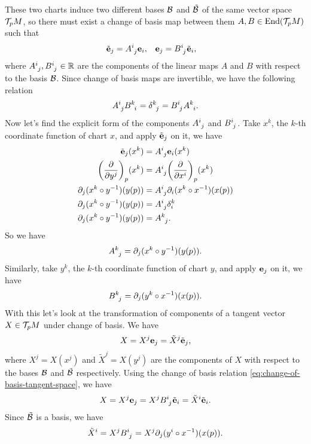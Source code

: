 These two charts induce two different bases \(\mathcal B\) and \(\tilde{\mathcal B}\) of the same vector space \(\mathcal T_p M\), so there must exist a change of basis map between them \(A, B \in \operatorname{End}(\mathcal T_p M)\) such that
\begin{align} \label{eq:change-of-basis-tangent-space}
    \tilde{\vb{e}}_j & = \tensor{A}{^i_j} \vb{e}_i, & \vb{e}_j & = \tensor{B}{^i_j} \tilde{\vb{e}}_i,
\end{align}
where \(\tensor{A}{^i_j}, \tensor{B}{^i_j} \in \R\) are the components of the linear maps \(A\) and \(B\) with respect to the basis \(\mathcal B\). Since change of basis maps are invertible, we have the following relation
\begin{equation}
    \tensor{A}{^i_j} \tensor{B}{^k_i} = \tensor{\delta}{^k_j} = \tensor{B}{^i_j} \tensor{A}{^k_i}.
\end{equation}
Now let's find the explicit form of the components \(\tensor{A}{^i_j}\) and \(\tensor{B}{^i_j}\). Take \(x^k\), the \(k\)-th coordinate function of chart \(x\), and apply \(\tilde{\vb{e}}_j\) on it, we have
\begin{align*}
    \tilde{\vb{e}}_j(x^k)               & = \tensor{A}{^i_j} \vb{e}_i(x^k)                       \\
    \qty(\pdv{y^j})_p (x^k)             & = \tensor{A}{^i_j} \qty(\pdv{x^i})_p (x^k)             \\
    \partial_j (x^k \circ y^{-1})(y(p)) & = \tensor{A}{^i_j} \partial_i (x^k \circ x^{-1})(x(p)) \\
    \partial_j (x^k \circ y^{-1})(y(p)) & = \tensor{A}{^i_j} \delta_i^k                          \\
    \partial_j (x^k \circ y^{-1})(y(p)) & = \tensor{A}{^k_j}.
\end{align*}
So we have
\begin{equation}
    \tensor{A}{^k_j} = \partial_j (x^k \circ y^{-1})(y(p)).
\end{equation}
Similarly, take \(y^k\), the \(k\)-th coordinate function of chart \(y\), and apply \(\vb{e}_j\) on it, we have
\begin{equation}
    \tensor{B}{^k_j} = \partial_j (y^k \circ x^{-1})(x(p)).
\end{equation}
With this let's look at the transformation of components of a tangent vector \(X \in \mathcal T_p M\) under change of basis. We have
\begin{equation}
    X = X^j \vb{e}_j = \tilde{X}^j \tilde{\vb{e}}_j,
\end{equation}
where \(X^j = X(x^j)\) and \(\tilde{X}^j = X(y^j)\) are the components of \(X\) with respect to the bases \(\mathcal B\) and \(\tilde{\mathcal B}\) respectively. Using the change of basis relation \eqref{eq:change-of-basis-tangent-space}, we have
\begin{equation*}
    X = X^j \vb{e}_j = X^j \tensor{B}{^i_j} \tilde{\vb{e}}_i = \tilde{X}^i \tilde{\vb{e}}_i.
\end{equation*}
Since \(\tilde{\mathcal B}\) is a basis, we have
\begin{equation}
    \tilde{X}^i = X^j \tensor{B}{^i_j} = X^j \partial_j (y^i \circ x^{-1})(x(p)).
\end{equation}

